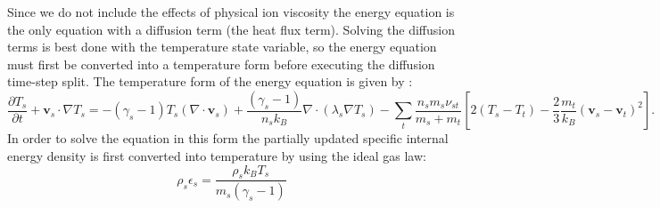 \documentclass[11pt,letterpaper]{article}
\begin{document}
Since we do not include the effects of physical ion viscosity the energy equation is the only equation with a diffusion term (the heat flux term).  Solving the diffusion terms is best done with the temperature state variable, so the energy equation must first be converted into a temperature form before executing the diffusion time-step split.  The temperature form of the energy equation is given by \citep{Zettergren:2012}:
\begin{equation}
\frac{\partial T_s}{\partial t} + \mathbf{v}_s \cdot \nabla T_s = - \left( \gamma_s - 1 \right) T_s (\nabla \cdot \mathbf{v}_s)  + \frac{\left( \gamma_s - 1 \right)}{ n_s k_B} \nabla \cdot \left( \lambda_s \nabla T_s \right) -\sum_t \frac{n_s m_s \nu_{st}}{m_s + m_t}\left[ 2 (T_s-T_t) - \frac{2}{3} \frac{m_t}{k_B}(\mathbf{v}_s-\mathbf{v}_t)^2 \right].
\end{equation}
In order to solve the equation in this form the partially updated specific internal energy density is first converted into temperature by using the ideal gas law:
\begin{equation}
\rho_s \epsilon_s = \frac{\rho_s k_B T_s}{m_s \left( \gamma_s - 1 \right)}
\end{equation}
\end{document}
